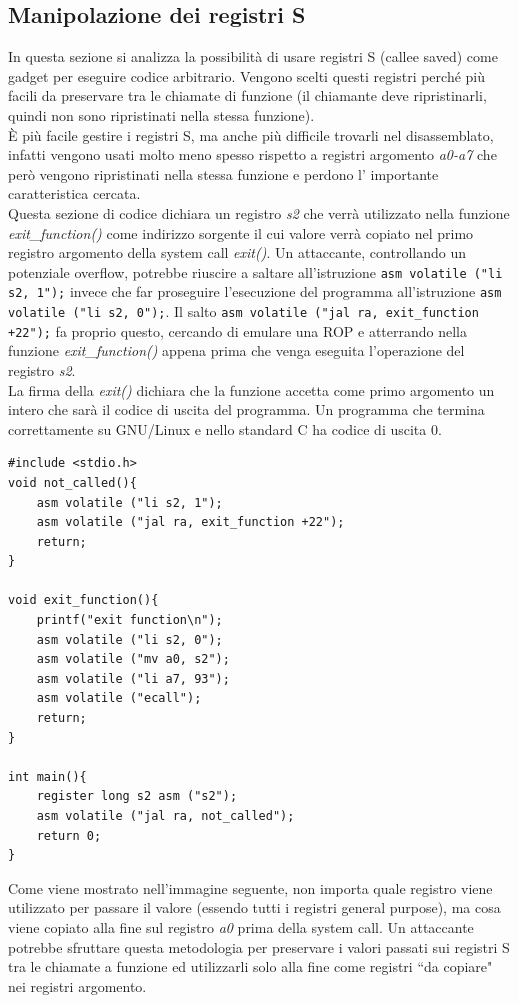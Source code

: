  \subsection*{Manipolazione dei registri S}
In questa sezione si analizza la possibilità di usare registri S (callee saved) come gadget per eseguire codice arbitrario. Vengono scelti questi registri perché più facili da preservare tra le chiamate di funzione (il chiamante deve ripristinarli, quindi non sono ripristinati nella stessa funzione).\\
È più facile gestire i registri S, ma anche più difficile trovarli nel disassemblato, infatti vengono usati molto meno spesso rispetto a registri argomento \textit{a0-a7} che però vengono ripristinati nella stessa funzione e perdono l' importante caratteristica cercata.\\
\newline
Questa sezione di codice dichiara un registro \textit{s2} che verrà utilizzato nella funzione \textit{exit\_function()} come indirizzo sorgente il cui valore verrà copiato nel primo registro argomento della system call \textit{exit()}. Un attaccante, controllando un potenziale overflow, potrebbe riuscire a saltare all'istruzione \texttt{asm volatile ("li s2, 1");} invece che far proseguire l'esecuzione del programma all'istruzione \texttt{asm volatile ("li s2, 0");}. Il salto \texttt{asm volatile ("jal ra, exit\_function +22");} fa proprio questo, cercando di emulare una ROP e atterrando nella funzione \textit{exit\_function()} appena prima che venga eseguita l'operazione del registro \textit{s2}.\\
La firma della \textit{exit()} dichiara che la funzione accetta come primo argomento un intero che sarà il codice di uscita del programma. Un programma che termina correttamente su GNU/Linux e nello standard C ha codice di uscita 0.
\begin{verbatim}
#include <stdio.h>
void not_called(){
	asm volatile ("li s2, 1");
	asm volatile ("jal ra, exit_function +22");
	return;
}

void exit_function(){
	printf("exit function\n");
	asm volatile ("li s2, 0");
	asm volatile ("mv a0, s2");
	asm volatile ("li a7, 93");
	asm volatile ("ecall");
	return;
}

int main(){
	register long s2 asm ("s2");
	asm volatile ("jal ra, not_called");
	return 0;
}
\end{verbatim}
Come viene mostrato nell'immagine seguente, non importa quale registro viene utilizzato per passare il valore (essendo tutti i registri general purpose), ma cosa viene copiato alla fine sul registro \textit{a0} prima della system call. Un attaccante potrebbe sfruttare questa metodologia per preservare i valori passati sui registri S tra le chiamate a funzione ed utilizzarli solo alla fine come registri ``da copiare" nei registri argomento.\\
